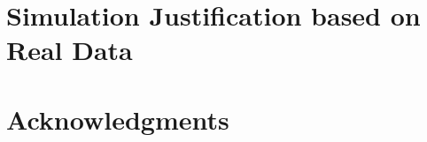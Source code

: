 \documentclass[11pt]{article}
\begin{document}
\section{Simulation Justification based on Real Data}

\section*{Acknowledgments}

\end{document}
